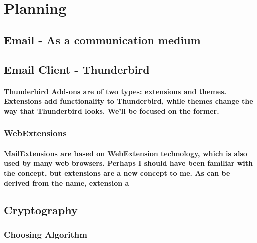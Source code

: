 \section{Planning}






\subsection{Email - As a communication medium}

\subsection{Email Client - Thunderbird}

\paragraph{Thunderbird Add-ons are of two types: extensions and themes. Extensions add functionality to Thunderbird, while themes change the way that Thunderbird looks. We'll be focused on the former.}

\subsubsection{WebExtensions}
\paragraph{MailExtensions are based on WebExtension technology, which is also used by many web browsers. Perhaps I should have been familiar with the concept, but extensions are a new concept to me. As can be derived from the name, extension a}

\subsection{Cryptography}
\subsubsection{Choosing Algorithm}
